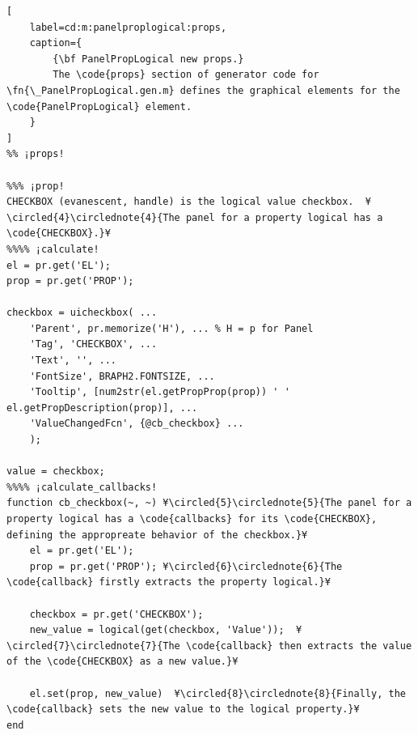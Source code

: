 \documentclass{tufte-handout}
\begin{document}
\begin{lstlisting}[
	label=cd:m:panelproplogical:props,
	caption={
		{\bf PanelPropLogical new props.}
		The \code{props} section of generator code for \fn{\_PanelPropLogical.gen.m} defines the graphical elements for the \code{PanelPropLogical} element.
	}
]
%% ¡props!

%%% ¡prop!
CHECKBOX (evanescent, handle) is the logical value checkbox.  ¥\circled{4}\circlednote{4}{The panel for a property logical has a \code{CHECKBOX}.}¥
%%%% ¡calculate!
el = pr.get('EL');
prop = pr.get('PROP');

checkbox = uicheckbox( ...
    'Parent', pr.memorize('H'), ... % H = p for Panel
    'Tag', 'CHECKBOX', ...
    'Text', '', ...
    'FontSize', BRAPH2.FONTSIZE, ...
    'Tooltip', [num2str(el.getPropProp(prop)) ' ' el.getPropDescription(prop)], ...
    'ValueChangedFcn', {@cb_checkbox} ...
    );

value = checkbox;
%%%% ¡calculate_callbacks!
function cb_checkbox(~, ~) ¥\circled{5}\circlednote{5}{The panel for a property logical has a \code{callbacks} for its \code{CHECKBOX}, defining the appropreate behavior of the checkbox.}¥
    el = pr.get('EL');
    prop = pr.get('PROP'); ¥\circled{6}\circlednote{6}{The \code{callback} firstly extracts the property logical.}¥
    
    checkbox = pr.get('CHECKBOX');
    new_value = logical(get(checkbox, 'Value'));  ¥\circled{7}\circlednote{7}{The \code{callback} then extracts the value of the \code{CHECKBOX} as a new value.}¥
    
    el.set(prop, new_value)  ¥\circled{8}\circlednote{8}{Finally, the \code{callback} sets the new value to the logical property.}¥
end

\end{lstlisting}
\end{document}
